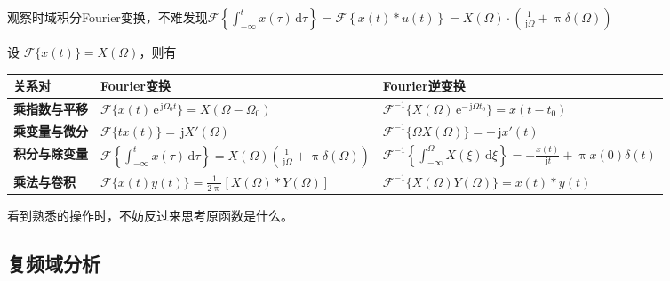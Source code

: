 \documentclass[UTF8,fontset=fandol,zihao=5]{ctexart}
\newcommand{\jj}{\,\mathrm{j}}
\newcommand{\ee}{\,\mathrm{e}}
\newcommand{\dd}{\,\mathrm{d}}
\newcommand{\FF}{\mathcal{F}}
\begin{document}
\begin{methodbox}[【理解】微分的实际意义]
  观察时域积分Fourier变换，不难发现$\displaystyle \FF \left\{ \int_{-\infty}^{t} x(\tau)\dd\tau \right\} = \FF\left\{x(t) \ast u(t) \right\} = X(\varOmega) \cdot \left( \frac{1}{\jj\varOmega} + \uppi\delta(\varOmega) \right)$
\end{methodbox}

\begin{methodbox}[【技巧】时频变换对应]
  设 $\FF\{x(t)\}=X(\varOmega)$，则有

  \begin{center}
  \begin{tabularx}{0.98\textwidth}{>{\bfseries}p{2.4cm}X X}
  \toprule
  关系对 & Fourier变换 & Fourier逆变换 \\
  \midrule

  乘指数与平移
  &
  $\displaystyle
  \FF\{x(t)\ee^{\jj\varOmega_0 t}\}
  =
  X(\varOmega-\varOmega_0)
  $
  &
  $\displaystyle
  \FF^{-1}
  \{X(\varOmega)\ee^{-\jj\varOmega t_0}\}
  =
  x(t-t_0)
  $
  \\

  乘变量与微分
  &
  $\displaystyle
  \FF\{t x(t)\}
  =
  \jj X'(\varOmega)
  $
  &
  $\displaystyle
  \FF^{-1}\{\varOmega X(\varOmega)\}
  =
  -\jj x'(t)
  $
  \\

  积分与除变量
  &
  $\displaystyle
  \FF
  \left\{
    \int_{-\infty}^{t}x(\tau)\dd\tau
  \right\}
  =
  X(\varOmega)
  \left(
    \frac{1}{\jj\varOmega}
    +
    \uppi\delta(\varOmega)
  \right)
  $
  &
  $\displaystyle
  \FF^{-1}
  \left\{
    \int_{-\infty}^{\varOmega}X(\xi)\dd\xi
  \right\}
  =
  -\frac{x(t)}{\jj t}
  +
  \uppi x(0)\delta(t)
  $
  \\

  乘法与卷积
  &
  $\displaystyle
  \FF\{x(t)y(t)\}
  =
  \frac{1}{2\uppi}
  \left[
    X(\varOmega)\ast Y(\varOmega)
  \right]
  $
  &
  $\displaystyle
  \FF^{-1}
  \{X(\varOmega)Y(\varOmega)\}
  =
  x(t)\ast y(t)
  $
  \\

  \bottomrule
  \end{tabularx}
  \end{center}

  看到熟悉的操作时，不妨反过来思考原函数是什么。
\end{methodbox}

\subsection{复频域分析}
\end{document}
